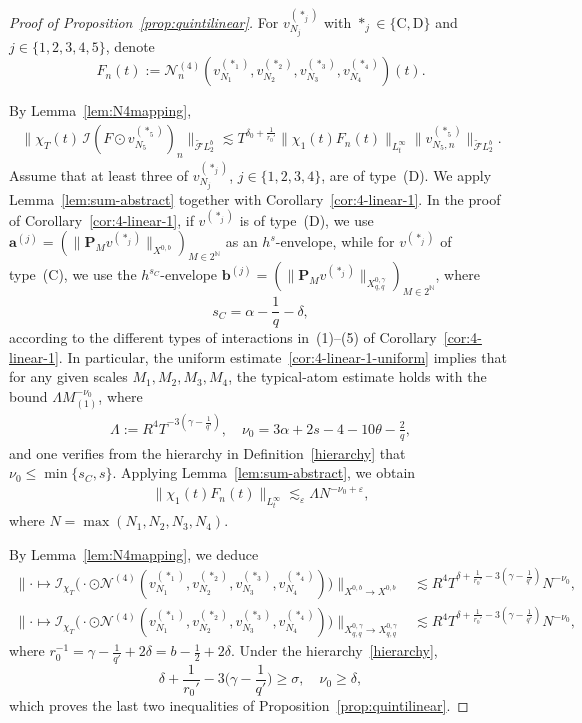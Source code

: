 \documentclass[11pt,reqno,english]{amsart}
\numberwithin{equation}{section}
\theoremstyle{plain}
\theoremstyle{definition}
\theoremstyle{remark}
\renewcommand{\epsilon}{\varepsilon}
\newcommand{\N}{\mathbb{N}}
\newcommand{\dotcirc}{\mathbin{\odot}}
\begin{document}
\begin{proof}[Proof of Proposition~\ref{prop:quintilinear}]

For $v_{N_j}^{(\ast_j)}$ with $\ast_j\in\{\mathrm{C},\mathrm{D}\}$ and $j\in\{1,2,3,4,5\}$, denote
\[
F_n(t):=\mathcal{N}_n^{(4)}(v_{N_1}^{(\ast_1)},v_{N_2}^{(\ast_2)},v_{N_3}^{(\ast_3)},v_{N_4}^{(\ast_4)})(t).
\]

By Lemma~\ref{lem:N4mapping},
\begin{align*}
	\big\|\chi_T(t)\,\mathcal{I}(F\dotcirc v_{N_5}^{(\ast_5)})_n\big\|_{\widetilde{\mathcal{F}}L_2^{b}}\lesssim T^{\delta_0+\frac{1}{r_0'}}\|\chi_1(t)F_n(t)\|_{L_t^{\infty}}\|v_{N_5,n}^{(\ast_5)}\|_{\widetilde{\mathcal{F}}L_2^b}.
\end{align*}
Assume that at least three of $v_{N_j}^{(\ast_j)}$, $j\in\{1,2,3,4\}$, are of type~(D). We apply Lemma~\ref{lem:sum-abstract} together with Corollary~\ref{cor:4-linear-1}.
In the proof of Corollary~\ref{cor:4-linear-1}, if $v^{(\ast_j)}$ is of type~(D), we use $\mathbf{a}^{(j)}=(\|\mathbf{P}_{M}v^{(\ast_j)}\|_{X^{0,b}})_{M\in 2^{\N}}$ as an $h^s$-envelope, while
for $v^{(\ast_j)}$ of type~(C), we use the $h^{s_C}$-envelope $\mathbf{b}^{(j)}=(\|\mathbf{P}_M v^{(\ast_j)}\|_{X_{q,q}^{0,\gamma}})_{M\in 2^{\N}}$, where
\[
s_C=\alpha-\frac{1}{q}-\delta,
\]
according to the different types of interactions in~(1)--(5) of Corollary~\ref{cor:4-linear-1}. In particular, the uniform estimate~\eqref{cor:4-linear-1-uniform} implies that for any given scales $M_1,M_2,M_3,M_4$, the typical-atom estimate holds with the bound $\Lambda M_{(1)}^{-\nu_0}$, where
\begin{align}\label{eq:Lambdanu_0}
	\Lambda:=R^4 T^{-3(\gamma-\frac{1}{q'})},\quad \nu_0=3\alpha+2s-4-10\theta-\frac{2}{q},
\end{align}
and one verifies from the hierarchy in Definition~\ref{hierarchy} that $\nu_0\leq \min\{s_C,s\}$. Applying Lemma~\ref{lem:sum-abstract}, we obtain
\begin{align}\label{bd:finalN_n^4}
	\|\chi_1(t)F_n(t)\|_{L_t^{\infty}}\lesssim_{\epsilon} \Lambda N^{-\nu_0+\epsilon},
\end{align}
where $N=\max(N_1,N_2,N_3,N_4)$.

By Lemma~\ref{lem:N4mapping}, we deduce
\begin{align}
	\big\|\cdot\mapsto
	\mathcal{I}_{\chi_T}\big(
	\cdot\dotcirc\mathcal{N}^{(4)}(v_{N_1}^{(\ast_1)},v_{N_2}^{(\ast_2)},v_{N_3}^{(\ast_3)},v_{N_4}^{(\ast_4)})
	\big)\big\|_{X^{0,b}\to X^{0,b}}
	&\lesssim R^4 T^{\delta+\frac{1}{r_0'}-3(\gamma-\frac{1}{q'})}N^{-\nu_0},\label{opquintic:X0b}\\
	\big\|\cdot\mapsto
	\mathcal{I}_{\chi_T}\big(
	\cdot\dotcirc\mathcal{N}^{(4)}(v_{N_1}^{(\ast_1)},v_{N_2}^{(\ast_2)},v_{N_3}^{(\ast_3)},v_{N_4}^{(\ast_4)})
	\big)\big\|_{X_{q,q}^{0,\gamma}\to X_{q,q}^{0,\gamma}}
	&\lesssim R^4 T^{\delta+\frac{1}{r_0'}-3(\gamma-\frac{1}{q'})}N^{-\nu_0}, \label{opquintic:X0q}
\end{align}
where $r_0^{-1}=\gamma-\frac{1}{q'}+2\delta=b-\frac{1}{2}+2\delta$. Under the hierarchy~\eqref{hierarchy},
\[
\delta+\frac{1}{r_0'}-3\Big(\gamma-\frac{1}{q'}\Big)\geq \sigma,
\quad\nu_0\geq \delta,
\]
which proves the last two inequalities of Proposition~\ref{prop:quintilinear}.


\end{proof}
\end{document}
